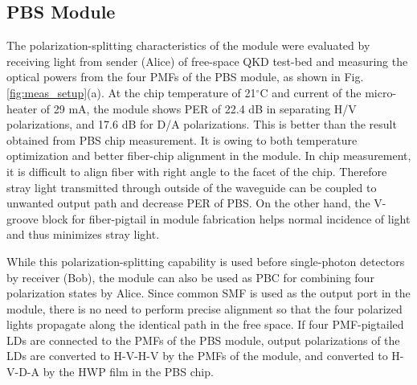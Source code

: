 \documentclass[letterpaper, 10pt]{article}
\begin{document}
\subsection{PBS Module}
The polarization-splitting characteristics of the module were evaluated by receiving light from sender (Alice) of free-space QKD test-bed and measuring the optical powers from the four PMFs of the PBS module, as shown in Fig. \ref{fig:meas_setup}(a).
At the chip temperature of 21$^\circ$C and current of the micro-heater of 29 mA, the module shows PER of 22.4 dB in separating H/V polarizations, and 17.6 dB for D/A polarizations.
This is better than the result obtained from PBS chip measurement.
It is owing to both temperature optimization and better fiber-chip alignment in the module.
In chip measurement, it is difficult to align fiber with right angle to the facet of the chip.
Therefore stray light transmitted through outside of the waveguide can be coupled to unwanted output path and decrease PER of PBS.
On the other hand, the V-groove block for fiber-pigtail in module fabrication helps normal incidence of light and thus minimizes stray light.

While this polarization-splitting capability is used before single-photon detectors by receiver (Bob), the module can also be used as PBC for combining four polarization states by Alice.
Since common SMF is used as the output port in the module, there is no need to perform precise alignment so that the four polarized lights propagate along the identical path in the free space.
If four PMF-pigtailed LDs are connected to the PMFs of the PBS module, output polarizations of the LDs are converted to H-V-H-V  by the PMFs of the module, and converted to  H-V-D-A  by the HWP film in the PBS chip.
\end{document}
